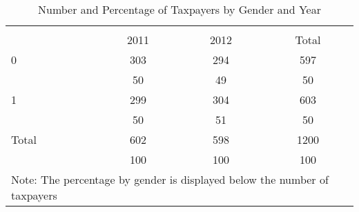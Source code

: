 \begin{table}[htbp]\centering
\def\sym#1{\ifmmode^{#1}\else\(^{#1}\)\fi}
\caption{Number and Percentage of Taxpayers by Gender and Year}
\begin{tabular}{l*{3}{c}}
\hline\hline
            &\multicolumn{3}{c}{}                  \\
            &        2011&        2012&       Total\\
\hline
0           &         303&         294&         597\\
            &          50&          49&          50\\
1           &         299&         304&         603\\
            &          50&          51&          50\\
Total       &         602&         598&        1200\\
            &         100&         100&         100\\
\hline\hline
\multicolumn{4}{l}{\footnotesize Note: The percentage by gender is displayed below the number of taxpayers}\\
\end{tabular}
\end{table}
